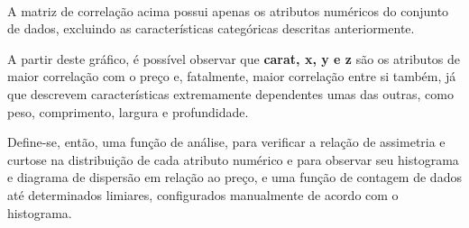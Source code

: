\documentclass[11pt]{article}
\begin{document}
    \begin{center}
    \end{center}
    { \hspace*{\fill} \\}
    
    A matriz de correlação acima possui apenas os atributos numéricos do
conjunto de dados, excluindo as características categóricas descritas
anteriormente.

A partir deste gráfico, é possível observar que \textbf{carat, x, y e z}
são os atributos de maior correlação com o preço e, fatalmente, maior
correlação entre si também, já que descrevem características
extremamente dependentes umas das outras, como peso, comprimento,
largura e profundidade.

    Define-se, então, uma função de análise, para verificar a relação de
assimetria e curtose na distribuição de cada atributo numérico e para
observar seu histograma e diagrama de dispersão em relação ao preço, e
uma função de contagem de dados até determinados limiares, configurados
manualmente de acordo com o histograma.
\end{document}
